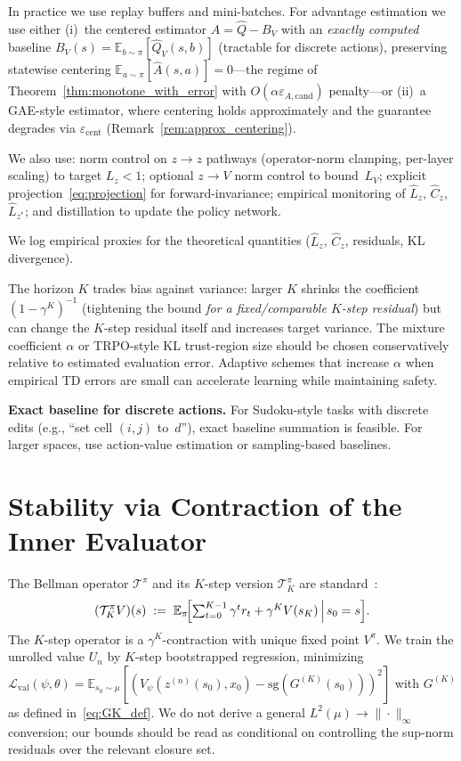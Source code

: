 \documentclass{article}
\theoremstyle{plain}
\theoremstyle{definition}
\theoremstyle{remark}
\newcommand{\shortonly}[1]{#1}
\newcommand{\longonly}[1]{}
\newcommand{\shortonly}[1]{}
\newcommand{\longonly}[1]{#1}
\newcommand{\E}{\mathbb{E}}
\begin{document}
{In practice we use replay buffers and mini-batches.
For advantage estimation we use either
(i)~the centered estimator\longonly{~\eqref{eq:Ahat_def}} $\widehat A = \widehat Q - B_V$ with an \emph{exactly computed} baseline $B_V(s)=\E_{b\sim\pi}[\widehat Q_V(s,b)]$ (tractable for discrete actions), preserving statewise centering $\E_{a\sim\pi}[\widehat A(s,a)]=0$---the regime of Theorem~\ref{thm:monotone_with_error} with $O(\alpha\varepsilon_{A,\mathrm{cand}})$ penalty---or
(ii)~a GAE-style estimator, where centering holds approximately and the guarantee degrades via $\varepsilon_{\mathrm{cent}}$ (Remark~\ref{rem:approx_centering}).

We also use:
norm control on $z{\to}z$ pathways (operator-norm clamping, per-layer scaling) to target $L_z<1$;
optional $z{\to}V$ norm control to bound~$L_V$;
explicit projection~\eqref{eq:projection} for forward-invariance;
empirical monitoring of $\hat L_z$, $\hat C_z$, $\widehat{L}_{z^*}$;
and distillation to update the policy network.

We log empirical proxies for the theoretical quantities ($\hat L_z$, $\hat C_z$, residuals, KL divergence).

The horizon $K$ trades bias against variance: larger $K$ shrinks the coefficient $(1-\gamma^K)^{-1}$ (tightening the bound \emph{for a fixed/comparable $K$-step residual}) but can change the $K$-step residual itself and increases target variance.
The mixture coefficient $\alpha$ or TRPO-style KL trust-region size should be chosen conservatively relative to estimated evaluation error.
Adaptive schemes that increase $\alpha$ when empirical TD errors are small can accelerate learning while maintaining safety.

\textbf{Exact baseline for discrete actions.}
For Sudoku-style tasks with discrete edits (e.g., ``set cell $(i,j)$ to~$d$''), exact baseline summation is feasible.
For larger spaces, use action-value estimation or sampling-based baselines.}

\section{Stability via Contraction of the Inner Evaluator}
\label{sec:contraction}

\shortonly{
The Bellman operator $\mathcal{T}^\pi$ and its $K$-step version $\mathcal{T}^\pi_K$ are standard~\citep{SuttonBarto2018,Puterman1994}:
\begin{equation}
(\mathcal{T}^\pi_K V)(s) \;:=\; \E_\pi\!\Bigl[\textstyle\sum_{t=0}^{K-1}\gamma^t r_t + \gamma^K V(s_K)\,\Big|\,s_0=s\Bigr].
\label{eq:TK_def_short}
\end{equation}
The $K$-step operator is a $\gamma^K$-contraction with unique fixed point $V^\pi$.
We train the unrolled value $U_n$ by $K$-step bootstrapped regression, minimizing $\mathcal{L}_{\mathrm{val}}(\psi,\theta)=\E_{s_0\sim\mu}[(V_\psi(z^{(n)}(s_0),x_0)-\mathrm{sg}(G^{(K)}(s_0)))^2]$ with $G^{(K)}$ as defined in~\eqref{eq:GK_def}.
We do not derive a general $L^2(\mu)\to\|\cdot\|_\infty$ conversion; our bounds should be read as conditional on controlling the sup-norm residuals over the relevant closure set.}
\end{document}
